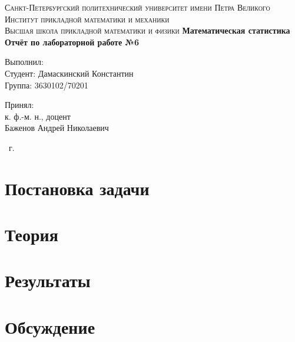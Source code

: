 \documentclass[14pt,a4paper,article]{ncc}
\begin{document}
\begin{titlepage}
    \begin{center}
        \textsc{
            Санкт-Петербургский политехнический университет имени Петра Великого \\[5mm]
            Институт прикладной математики и механики\\[2mm]
            Высшая школа прикладной математики и физики            
        }   
        \vfill
        \textbf{\large
            Математическая статистика\\
            Отчёт по лабораторной работе №6 \\[3mm]
        }                
    \end{center}

    \vfill
    \hfill
    \begin{minipage}{0.5\textwidth}
        Выполнил: \\[2mm]   
		Студент: Дамаскинский Константин \\
		Группа: 3630102/70201\\
    \end{minipage}

	\hfill
	\begin{minipage}{0.5\textwidth}
		Принял: \\[2mm]
		к. ф.-м. н., доцент \\   
		Баженов Андрей Николаевич
	\end{minipage}

    \vfill
    \begin{center}
        \theyear\ г.
    \end{center}
\end{titlepage}

\tableofcontents
\listoffigures
\listoftables
\newpage

\section{Постановка задачи}
%
%
%


\section{Теория}
%
%




\section{Результаты}
%
%


\section{Обсуждение}

%
%




\end{document}
